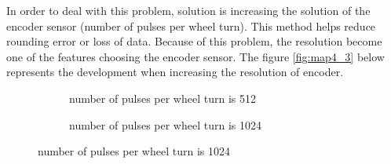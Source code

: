 \documentclass[letterpaper,12pt]{article}
\begin{document}
\noindent
In order to deal with this problem, solution is increasing the solution of the encoder sensor (number of pulses per wheel turn). This method helps reduce rounding error or loss of data. Because of this problem, the resolution become one of the features choosing the encoder sensor. The figure \ref{fig:map4_3} below represents the development when increasing the resolution of encoder.
\begin{figure}[H]
    \centering
    \begin{subfigure}[b]{8.cm}
        \centering
        \captionsetup{justification=centering}
        \caption{number of pulses per wheel turn is 512}
        \label{fig:kermit}
    \end{subfigure}
    \begin{subfigure}[b]{8.cm}
        \centering
        \captionsetup{justification=centering}
        \caption{number of pulses per wheel turn is 1024}
        \label{fig:rana}
    \end{subfigure}
\label{fig:map4_2}
\end{figure}
\end{document}
